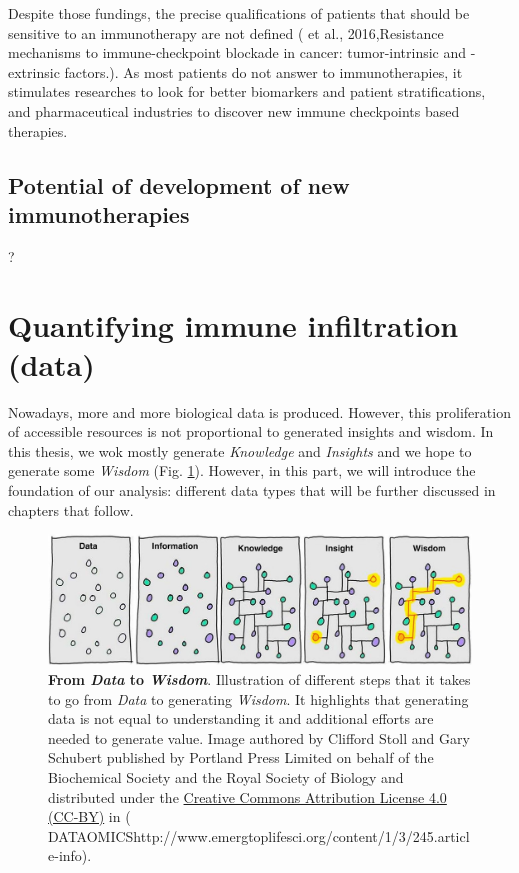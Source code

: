 \documentclass[12pt,]{book}
\theoremstyle{definition}
\theoremstyle{definition}
\theoremstyle{definition}
\theoremstyle{remark}
\begin{document}
Despite those fundings, the precise qualifications of patients that
should be sensitive to an immunotherapy are not defined (\citet{Pitt} et
al., 2016,Resistance mechanisms to immune-checkpoint blockade in cancer:
tumor-intrinsic and -extrinsic factors.). As most patients do not answer
to immunotherapies, it stimulates researches to look for better
biomarkers and patient stratifications, and pharmaceutical industries to
discover new immune checkpoints based therapies.

\hypertarget{potential-of-development-of-new-immunotherapies}{%
\subsection{Potential of development of new
immunotherapies}\label{potential-of-development-of-new-immunotherapies}}

?

\hypertarget{quantifying-immune-infiltration-data}{%
\section{Quantifying immune infiltration
(data)}\label{quantifying-immune-infiltration-data}}

Nowadays, more and more biological data is produced. However, this
proliferation of accessible resources is not proportional to generated
insights and wisdom. In this thesis, we wok mostly generate
\emph{Knowledge} and \emph{Insights} and we hope to generate some
\emph{Wisdom} (Fig. \ref{fig:information-power}). However, in this part,
we will introduce the foundation of our analysis: different data types
that will be further discussed in chapters that follow.

\begin{figure}

{\centering \includegraphics[width=0.8\linewidth]{figures-ext/01-Information_power} 

}

\caption{\textbf{From \emph{Data} to
\emph{Wisdom}}. Illustration of different steps that it takes to go from
\emph{Data} to generating \emph{Wisdom}. It highlights that generating
data is not equal to understanding it and additional efforts are needed
to generate value. Image authored by Clifford Stoll and Gary Schubert
published by Portland Press Limited on behalf of the Biochemical Society
and the Royal Society of Biology and distributed under the
\href{https://creativecommons.org/licenses/by/4.0/}{Creative Commons
Attribution License 4.0 (CC-BY)} in (\citet{BIG}
DATAOMICShttp://www.emergtoplifesci.org/content/1/3/245.article-info).}\label{fig:information-power}
\end{figure}
\end{document}
